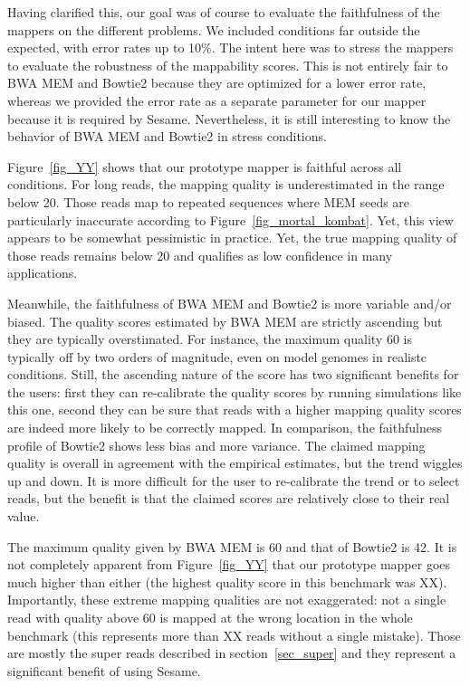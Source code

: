 \documentclass[a4,center,fleqn]{NAR}
\begin{document}
Having clarified this, our goal was of course to  evaluate the
faithfulness of the mappers on the different problems. We included
conditions far outside the expected, with error rates up to 10\%. The
intent here was to stress the mappers to evaluate the robustness of the
mappability scores. This is not entirely fair to BWA MEM and Bowtie2
because they are optimized for a lower error rate, whereas we provided the
error rate as a separate parameter for our mapper because it is required
by Sesame. Nevertheless, it is still interesting to know the behavior of
BWA MEM and Bowtie2 in stress conditions.

Figure~\ref{fig_YY} shows that our prototype mapper is faithful across all
conditions. For long reads, the mapping quality is underestimated in the
range below 20. Those reads map to repeated sequences where MEM seeds are
particularly inaccurate according to Figure~\ref{fig_mortal_kombat}. Yet,
this view appears to be somewhat pessimistic in practice. Yet, the true
mapping quality of those reads remains below 20 and qualifies as low
confidence in many applications.

Meanwhile, the faithfulness of BWA MEM and Bowtie2 is more variable and/or
biased. The quality scores estimated by BWA MEM are strictly ascending but
they are typically overstimated. For instance, the maximum quality 60 is
typically off by two orders of magnitude, even on model genomes in
realistc conditions. Still, the ascending nature of the score has two
significant benefits for the users: first they can re-calibrate the
quality scores by running simulations like this one, second they can be
sure that reads with a higher mapping quality scores are indeed more
likely to be correctly mapped. In comparison, the faithfulness profile of
Bowtie2 shows less bias and more variance. The claimed mapping quality is
overall in agreement with the empirical estimates, but the trend wiggles
up and down. It is more difficult for the user to re-calibrate the trend
or to select reads, but the benefit is that the claimed scores are
relatively close to their real value.

The maximum quality given by BWA MEM is 60 and that of Bowtie2 is 42. It
is not completely apparent from Figure~\ref{fig_YY} that our prototype
mapper goes much higher than either (the highest quality score in this
benchmark was XX). Importantly, these extreme mapping qualities are not
exaggerated: not a single read with quality above 60 is mapped at the
wrong location in the whole benchmark (this represents more than XX reads
without a single mistake). Those are mostly the super reads described in
section~\ref{sec_super} and they represent a significant benefit of using
Sesame.
\end{document}
